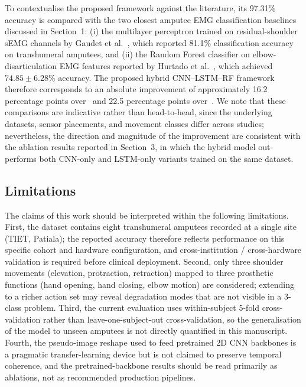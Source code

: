 \documentclass{elektr}
\newcommand{\yh}[1]{#1}
\begin{document}
\yh{To contextualise the proposed framework against the literature, its 97.31\% accuracy is compared with the two closest amputee EMG classification baselines discussed in Section~1: (i) the multilayer perceptron trained on residual-shoulder sEMG channels by Gaudet et al.~\cite{gaudet2018classification}, which reported 81.1\% classification accuracy on transhumeral amputees, and (ii) the Random Forest classifier on elbow-disarticulation EMG features reported by Hurtado et al.~\cite{hurtado2024movements}, which achieved $74.85 \pm 6.28\%$ accuracy. The proposed hybrid CNN--LSTM--RF framework therefore corresponds to an absolute improvement of approximately 16.2 percentage points over~\cite{gaudet2018classification} and 22.5 percentage points over~\cite{hurtado2024movements}. We note that these comparisons are indicative rather than head-to-head, since the underlying datasets, sensor placements, and movement classes differ across studies; nevertheless, the direction and magnitude of the improvement are consistent with the ablation results reported in Section~3, in which the hybrid model out-performs both CNN-only and LSTM-only variants trained on the same dataset.}

\subsection*{Limitations}
\yh{The claims of this work should be interpreted within the following limitations. First, the dataset contains eight transhumeral amputees recorded at a single site (TIET, Patiala); the reported accuracy therefore reflects performance on this specific cohort and hardware configuration, and cross-institution / cross-hardware validation is required before clinical deployment. Second, only three shoulder movements (elevation, protraction, retraction) mapped to three prosthetic functions (hand opening, hand closing, elbow motion) are considered; extending to a richer action set may reveal degradation modes that are not visible in a 3-class problem. Third, the current evaluation uses within-subject 5-fold cross-validation rather than leave-one-subject-out cross-validation, so the generalisation of the model to unseen amputees is not directly quantified in this manuscript. Fourth, the pseudo-image reshape used to feed pretrained 2D CNN backbones is a pragmatic transfer-learning device but is not claimed to preserve temporal coherence, and the pretrained-backbone results should be read primarily as ablations, not as recommended production pipelines.}
\end{document}
